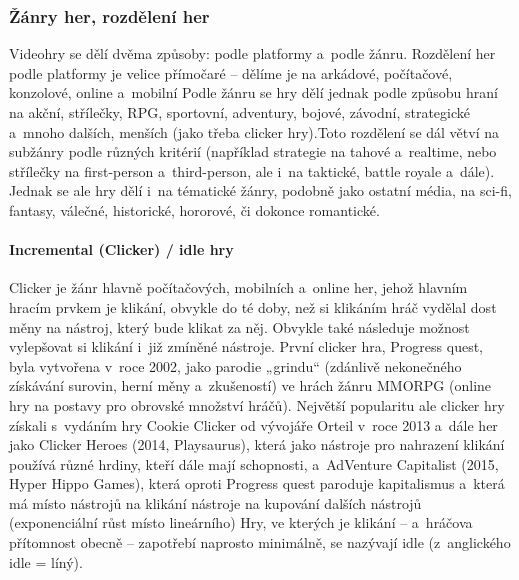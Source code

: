 \documentclass[a4paper]{extarticle}
\begin{document}
\subsubsection{Žánry her, rozdělení her}
Videohry se dělí dvěma způsoby: podle platformy a~podle žánru.
Rozdělení her podle platformy je velice přímočaré – dělíme je na arkádové, počítačové, konzolové, online a~mobilní
Podle žánru se hry dělí jednak podle způsobu hraní na akční, střílečky, RPG, sportovní, adventury, bojové, závodní, strategické a~mnoho dalších, menších (jako třeba clicker hry).Toto rozdělení se dál větví na subžánry podle různých kritérií (například strategie na tahové a~realtime, nebo střílečky na first-person a~third-person, ale i~na taktické, battle royale a~dále). Jednak se ale hry dělí i~na tématické žánry, podobně jako ostatní média, na sci-fi, fantasy, válečné, historické, hororové, či dokonce romantické.
\paragraph{Incremental (Clicker) / idle hry}
Clicker je žánr hlavně počítačových, mobilních a~online her, jehož hlavním hracím prvkem je klikání, obvykle do té doby, než si klikáním hráč vydělal dost měny na nástroj, který bude klikat za něj. Obvykle také následuje možnost vylepšovat si klikání i~již zmíněné nástroje.
První clicker hra, Progress quest, byla vytvořena v~roce 2002, jako parodie „grindu“ (zdánlivě nekonečného získávání surovin, herní měny a~zkušeností) ve hrách žánru MMORPG (online hry na postavy pro obrovské množství hráčů). Největší popularitu ale clicker hry získali s~vydáním hry Cookie Clicker od vývojáře Orteil v~roce 2013 a~dále her jako Clicker Heroes (2014, Playsaurus), která jako nástroje pro nahrazení klikání používá různé hrdiny, kteří dále mají schopnosti, a~AdVenture Capitalist (2015, Hyper Hippo Games), která oproti Progress quest paroduje kapitalismus a~která má místo nástrojů na klikání nástroje na kupování dalších nástrojů (exponenciální růst místo lineárního)
Hry, ve kterých je klikání – a~hráčova přítomnost obecně – zapotřebí naprosto minimálně, se nazývají idle (z~anglického idle = líný). 
\end{document}
